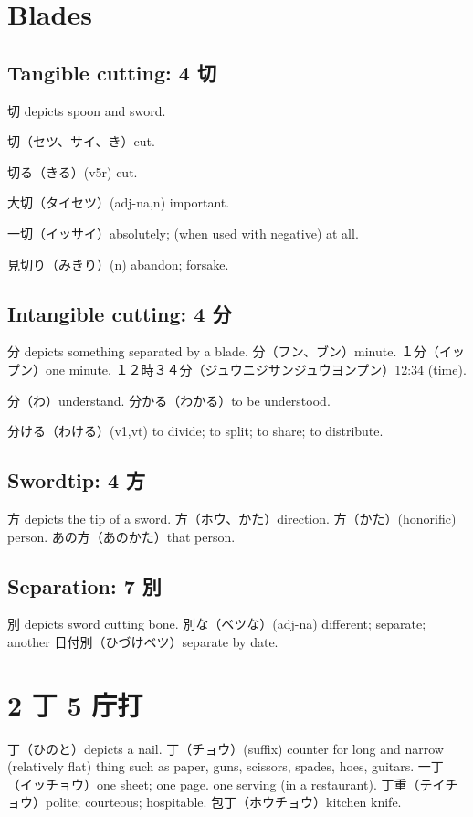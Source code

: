 \section{Blades}

\subsection{Tangible cutting: 4 切}

切 depicts spoon and sword.

切（セツ、サイ、き）cut.

切る（きる）(v5r) cut.

大切（タイセツ）(adj-na,n) important.

一切（イッサイ）absolutely; (when used with negative) at all.

見切り（みきり）(n) abandon; forsake.

\subsection{Intangible cutting: 4 分}

分 depicts something separated by a blade.
分（フン、ブン）minute.
１分（イップン）one minute.
１２時３４分（ジュウニジサンジュウヨンプン）12:34 (time).

分（わ）understand.
分かる（わかる）to be understood.

分ける（わける）(v1,vt) to divide; to split; to share; to distribute.

\subsection{Swordtip: 4 方}

方 depicts the tip of a sword.
方（ホウ、かた）direction.
方（かた）(honorific) person.
あの方（あのかた）that person.

\subsection{Separation: 7 別}

別 depicts sword cutting bone.
別な（ベツな）(adj-na) different; separate; another
日付別（ひづけベツ）separate by date.

\section{2 丁 5 庁打}

丁（ひのと）depicts a nail.
丁（チョウ）(suffix)
counter for long and narrow (relatively flat) thing
such as paper, guns, scissors, spades, hoes, guitars.
一丁（イッチョウ）one sheet; one page.
one serving (in a restaurant).
丁重（テイチョウ）polite; courteous; hospitable.
包丁（ホウチョウ）kitchen knife.

